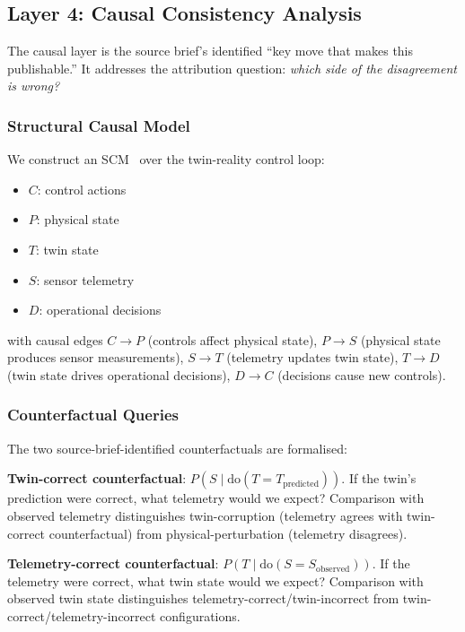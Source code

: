 \documentclass[sigconf,nonacm]{acmart}
\begin{document}
\subsection{Layer 4: Causal Consistency Analysis}

The causal layer is the source brief's identified ``key move that
makes this publishable.'' It addresses the attribution question:
\emph{which side of the disagreement is wrong?}

\subsubsection{Structural Causal Model}

We construct an SCM~\cite{pearl2009causality} over the twin-reality
control loop:

\begin{itemize}
  \item $C$: control actions
  \item $P$: physical state
  \item $T$: twin state
  \item $S$: sensor telemetry
  \item $D$: operational decisions
\end{itemize}

with causal edges $C \to P$ (controls affect physical state),
$P \to S$ (physical state produces sensor measurements), $S \to T$
(telemetry updates twin state), $T \to D$ (twin state drives
operational decisions), $D \to C$ (decisions cause new controls).

\subsubsection{Counterfactual Queries}

The two source-brief-identified counterfactuals are formalised:

\textbf{Twin-correct counterfactual}: $P(S \mid \text{do}(T = T_{\text{predicted}}))$.
If the twin's prediction were correct, what telemetry would we
expect? Comparison with observed telemetry distinguishes
twin-corruption (telemetry agrees with twin-correct counterfactual)
from physical-perturbation (telemetry disagrees).

\textbf{Telemetry-correct counterfactual}: $P(T \mid \text{do}(S = S_{\text{observed}}))$.
If the telemetry were correct, what twin state would we expect?
Comparison with observed twin state distinguishes
telemetry-correct/twin-incorrect from twin-correct/telemetry-incorrect
configurations.
\end{document}

